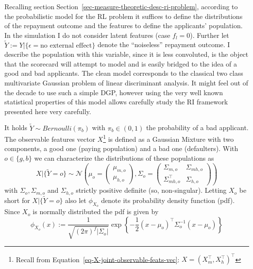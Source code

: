 \documentclass[
  12pt,
]{article}
\begin{document}
Recalling section Section~\ref{sec-measure-theoretic-desc-ri-problem},
according to the probabilistic model for the RL problem it suffices to
define the distributions of the repayment outcome and the features to
define the applicants' population. In the simulation I do not consider
latent features (case \(f_l = 0\)). Further let
\(\tilde{Y} := Y | \{\epsilon = \text{no external effect}\}\) denote the
``noiseless'' repayment outcome. I describe the population with this
variable, since it is less convoluted, is the object that the scorecard
will attempt to model and is easily bridged to the idea of a good and
bad applicants. The clean model corresponds to the classical two class
multivariate Gaussian problem of linear discriminant analysis. It might
feel out of the decade to use such a simple DGP, however using the very
well known statistical properties of this model allows carefully study
the RI framework presented here very carefully.

It holds \(\tilde{Y} \sim Bernoulli(\pi_{b})\) with \(\pi_b \in (0,1)\)
the probability of a bad applicant. The observable features vector
\(X\)\footnote{ Recall from
  Equation~\ref{eq-X-joint-observable-feats-vec}:
  \(X = \left(X_m^{\top}, X_h^{\top} \right)^{\top}\)} is defined as a
Gaussian Mixture with two components, a good one (paying population) and
a bad one (defaulters). With \(o \in \{g, b\}\) we can characterize the
distributions of these populations as \[
X | \{\tilde{Y}=o\} \sim \mathcal{N}\left(
    \mu_o =
    \begin{pmatrix}
        \mu_{m, o} \\ \mu_{h, o}
    \end{pmatrix},
    \Sigma_o =
    \begin{pmatrix}
        \Sigma_{m, o} & \Sigma_{mh, o} \\
        \Sigma_{mh, o}^{\top} & \Sigma_{h, o}
    \end{pmatrix}
\right)
\] with \(\Sigma_o, \Sigma_{m, o}\) and \(\Sigma_{h, o}\) strictly
positive definite (so, non-singular). Letting \(X_o\) be short for
\(X | \{\tilde{Y}=o\}\) also let \(\phi_{X_o}\) denote its probability
density function (pdf). Since \(X_o\) is normally distributed the pdf is
given by \[
\phi_{X_o}(x) := 
\frac{1}{\sqrt{(2\pi)^f |\Sigma_o|} }
\exp\left\{-\frac{1}{2} (x-\mu_o)^\top \Sigma_o^{-1} (x-\mu_o)\right\}
\]
\end{document}
